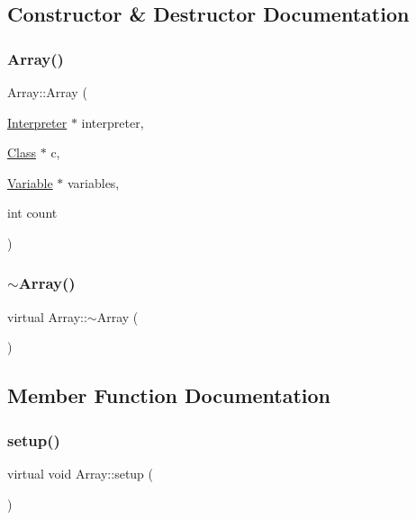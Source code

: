 \subsection{Constructor \& Destructor Documentation}
\mbox{\label{classArray_a6bf7af2f8348ab6b96a656c2f2ea27ed}} 
\subsubsection{\texorpdfstring{Array()}{Array()}}
{\footnotesize\ttfamily Array\+::\+Array (\begin{DoxyParamCaption}\item[{\hyperlink{classInterpreter}{Interpreter} $\ast$}]{interpreter,  }\item[{\hyperlink{classClass}{Class} $\ast$}]{c,  }\item[{\hyperlink{classVariable}{Variable} $\ast$}]{variables,  }\item[{int}]{count }\end{DoxyParamCaption})}

\mbox{\label{classArray_a66d3fee8e78097d35709028b3ba02803}} 
\subsubsection{\texorpdfstring{$\sim$\+Array()}{~Array()}}
{\footnotesize\ttfamily virtual Array\+::$\sim$\+Array (\begin{DoxyParamCaption}{ }\end{DoxyParamCaption})\hspace{0.3cm}{\ttfamily [virtual]}}



\subsection{Member Function Documentation}
\mbox{\label{classArray_ac9828e89510c879b36acc6eca5efef51}} 
\subsubsection{\texorpdfstring{setup()}{setup()}}
{\footnotesize\ttfamily virtual void Array\+::setup (\begin{DoxyParamCaption}{ }\end{DoxyParamCaption})\hspace{0.3cm}{\ttfamily [virtual]}}



